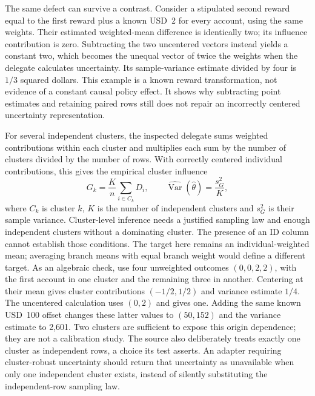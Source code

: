 The same defect can survive a contrast. Consider a stipulated second reward
equal to the first reward plus a known USD~2 for every account, using the
same weights. Their estimated weighted-mean difference is identically two;
its influence contribution is zero. Subtracting the two uncentered vectors
instead yields a constant two, which becomes the unequal vector of twice
the weights when the delegate calculates uncertainty. Its sample-variance
estimate divided by four is $1/3$ squared dollars. This example is a known
reward transformation, not evidence of a constant causal policy effect. It
shows why subtracting point estimates and retaining paired rows still does
not repair an incorrectly centered uncertainty representation.
\citep{rel23ifewitness}

For several independent clusters, the inspected delegate sums weighted
contributions within each cluster and multiplies each sum by the number of
clusters divided by the number of rows. With correctly centered individual
contributions, this gives the empirical cluster influence
\begin{equation}
 G_k=\frac{K}{n}\sum_{i\in C_k}D_i,\qquad
 \widehat{\operatorname{Var}}(\widehat\theta)
       =\frac{s_G^2}{K},
 \label{rel23:cluster-influence}
\end{equation}
where $C_k$ is cluster $k$, $K$ is the number of independent clusters and
$s_G^2$ is their sample variance. Cluster-level inference needs a justified
sampling law and enough independent clusters without a dominating cluster.
The presence of an ID column cannot establish those conditions. The target
here remains an individual-weighted mean; averaging branch means with equal
branch weight would define a different target. As an algebraic check, use four unweighted outcomes
$(0,0,2,2)$, with the first account in one cluster and the remaining three in
another. Centering at their mean gives cluster contributions $(-1/2,1/2)$
and variance estimate $1/4$. The uncentered calculation uses $(0,2)$ and gives
one. Adding the same known USD~100 offset changes these latter values to
$(50,152)$ and the variance estimate to 2,601. Two clusters are sufficient to
expose this origin dependence; they are not a calibration study. The source
also deliberately treats exactly one cluster as independent rows, a choice
its test asserts. An adapter requiring cluster-robust uncertainty should
return that uncertainty as unavailable when only one independent cluster
exists, instead of silently substituting the independent-row sampling law.
\citep{rel23ife,rel23ifewitness}

